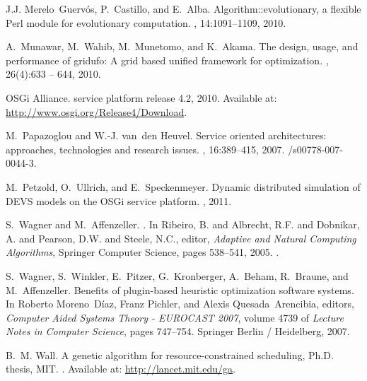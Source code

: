 \documentclass{sig-alternate}
\begin{document}
\begin{thebibliography}{10}
J.J. Merelo~Guerv\'os, P.~Castillo, and E.~Alba.
\newblock Algorithm::evolutionary, a flexible {P}erl module for evolutionary
  computation.
, 14:1091--1109, 2010.

A.~Munawar, M.~Wahib, M.~Munetomo, and K.~Akama.
\newblock The design, usage, and performance of gridufo: A grid based unified
  framework for optimization.
, 26(4):633 -- 644, 2010.

{OSGi Alliance}.
 service platform release 4.2, 2010.
\newblock Available at: \url{http://www.osgi.org/Release4/Download}.

M.~Papazoglou and W.-J. van~den Heuvel.
\newblock Service oriented architectures: approaches, technologies and research
  issues.
, 16:389--415, 2007.
/s00778-007-0044-3.

M.~Petzold, O.~Ullrich, and E.~Speckenmeyer.
\newblock Dynamic distributed simulation of {DEVS} models on the {OSGi} service
  platform.
, 2011.

S.~Wagner and M.~Affenzeller.
.
\newblock In {Ribeiro, B. and Albrecht, R.F. and Dobnikar, A. and Pearson, D.W.
  and Steele, N.C.}, editor, {\em {Adaptive and Natural Computing Algorithms}},
  {Springer Computer Science}, pages {538--541}, {2005}.
.

S.~Wagner, S.~Winkler, E.~Pitzer, G.~Kronberger, A.~Beham, R.~Braune, and
  M.~Affenzeller.
\newblock Benefits of plugin-based heuristic optimization software systems.
\newblock In Roberto Moreno~D{\'i}az, Franz Pichler, and Alexis
  Quesada~Arencibia, editors, {\em Computer Aided Systems Theory - EUROCAST
  2007}, volume 4739 of {\em Lecture Notes in Computer Science}, pages
  747--754. Springer Berlin / Heidelberg, 2007.

B.~M. Wall.
\newblock A genetic algorithm for resource-constrained scheduling, {Ph.D}.
  thesis, {MIT}.
.
\newblock Available at: \url{http://lancet.mit.edu/ga}.

\end{thebibliography}
\end{document}
